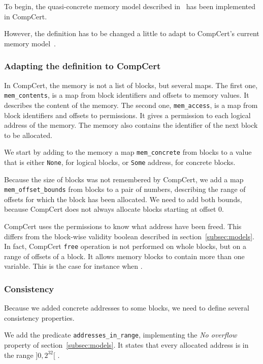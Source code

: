 \label{sec:memupdate}
To begin, the quasi-concrete memory model described in~\cite{DBLP:conf/pldi/KangHMGZV15} has been implemented in CompCert. 

However, the definition has to be changed a little to adapt to CompCert's current memory model~\cite{leroy:hal-00703441}.

\subsubsection{Adapting the definition to CompCert}
In CompCert, the memory is not a list of blocks, but several maps.
The first one, \texttt{mem\_contents}, is a map from block identifiers and offsets to memory values. It describes the content of the memory.
The second one, \texttt{mem\_access}, is a map from block identifiers and offsets to permissions. It gives a permission to each logical address of the memory.
The memory also contains the identifier of the next block to be allocated.

We start by adding to the memory a map \texttt{mem\_concrete} from blocks to a value that is either \texttt{None}, for logical blocks, or \texttt{Some} address, for concrete blocks.

Because the size of blocks was not remembered by CompCert, we add a map \texttt{mem\_offset\_bounds} from blocks to a pair of numbers, describing the range of offsets for which the block has been allocated. We need to add both bounds, because CompCert does not always allocate blocks starting at offset 0. 

CompCert uses the permissions to know what address have been freed. This differs from the block-wise validity boolean described in section~\ref{subsec:models}.
In fact, CompCert \texttt{free} operation is not performed on whole blocks, but on a range of offsets of a block. It allows memory blocks to contain more than one variable. This is the case for instance when .

\subsubsection{Consistency}
Because we added concrete addresses to some blocks, we need to define several consistency properties.

We add the predicate \texttt{addresses\_in\_range}, implementing the \textit{No overflow} property of section~\ref{subsec:models}. It states that every allocated address is in the range $]0,2^{32}[$ .

